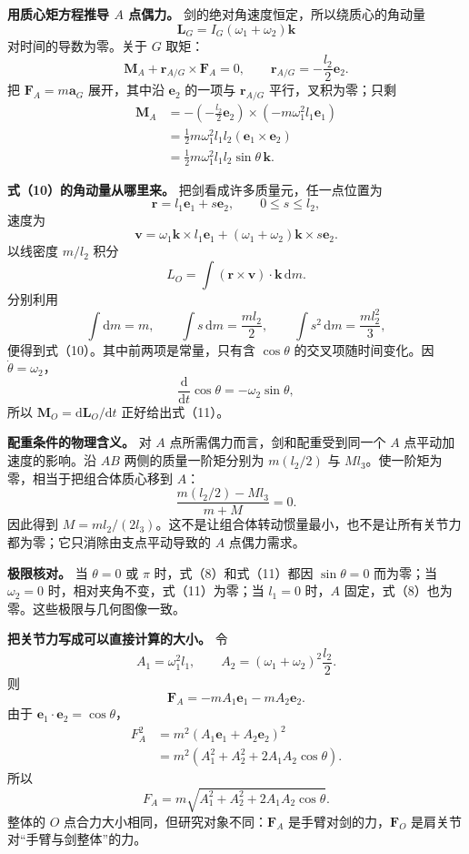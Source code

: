 \documentclass[12pt,a4paper,UTF8]{ctexart}
\begin{document}
\textbf{用质心矩方程推导 \(A\) 点偶力。}
剑的绝对角速度恒定，所以绕质心的角动量 \[
\boldsymbol L_G=I_G(\omega_1+\omega_2)\boldsymbol k
\] 对时间的导数为零。关于 \(G\) 取矩： \[
\boldsymbol M_A+\boldsymbol r_{A/G}\times\boldsymbol F_A=0,
\qquad
\boldsymbol r_{A/G}=-\frac{l_2}{2}\boldsymbol e_2.
\] 把 \(\boldsymbol F_A=m\boldsymbol a_G\) 展开，其中沿
\(\boldsymbol e_2\) 的一项与 \(\boldsymbol r_{A/G}\)
平行，叉积为零；只剩 \[
\begin{aligned}
\boldsymbol M_A
&=-\left(-\frac{l_2}{2}\boldsymbol e_2\right)
\times\left(-m\omega_1^2l_1\boldsymbol e_1\right)\\
&=\frac12m\omega_1^2l_1l_2
(\boldsymbol e_1\times\boldsymbol e_2)\\
&=\frac12m\omega_1^2l_1l_2\sin\theta\,\boldsymbol k.
\end{aligned}
\]

\textbf{式（10）的角动量从哪里来。} 把剑看成许多质量元，任一点位置为 \[
\boldsymbol r=l_1\boldsymbol e_1+s\boldsymbol e_2,
\qquad 0\le s\le l_2,
\] 速度为 \[
\boldsymbol v=\omega_1\boldsymbol k\times l_1\boldsymbol e_1
+(\omega_1+\omega_2)\boldsymbol k\times s\boldsymbol e_2.
\] 以线密度 \(m/l_2\) 积分 \[
L_O=\int(\boldsymbol r\times\boldsymbol v)\cdot\boldsymbol k\,\mathrm dm.
\] 分别利用 \[
\int\mathrm dm=m,
\qquad
\int s\,\mathrm dm=\frac{ml_2}{2},
\qquad
\int s^2\,\mathrm dm=\frac{ml_2^2}{3},
\] 便得到式（10）。其中前两项是常量，只有含 \(\cos\theta\)
的交叉项随时间变化。因 \(\dot\theta=\omega_2\)， \[
\frac{\mathrm d}{\mathrm dt}\cos\theta
=-\omega_2\sin\theta,
\] 所以 \(\boldsymbol M_O=\mathrm d\boldsymbol L_O/\mathrm dt\)
正好给出式（11）。

\textbf{配重条件的物理含义。} 对 \(A\)
点所需偶力而言，剑和配重受到同一个 \(A\) 点平动加速度的影响。沿 \(AB\)
两侧的质量一阶矩分别为 \(m(l_2/2)\) 与
\(Ml_3\)。使一阶矩为零，相当于把组合体质心移到 \(A\)： \[
\frac{m(l_2/2)-Ml_3}{m+M}=0.
\] 因此得到
\(M=ml_2/(2l_3)\)。这不是让组合体转动惯量最小，也不是让所有关节力都为零；它只消除由支点平动导致的
\(A\) 点偶力需求。

\textbf{极限核对。} 当 \(\theta=0\) 或 \(\pi\) 时，式（8）和式（11）都因
\(\sin\theta=0\) 而为零；当 \(\omega_2=0\)
时，相对夹角不变，式（11）为零；当 \(l_1=0\) 时，\(A\)
固定，式（8）也为零。这些极限与几何图像一致。

\textbf{把关节力写成可以直接计算的大小。} 令 \[
A_1=\omega_1^2l_1,
\qquad
A_2=(\omega_1+\omega_2)^2\frac{l_2}{2}.
\] 则 \[
\boldsymbol F_A
=-mA_1\boldsymbol e_1-mA_2\boldsymbol e_2.
\] 由于 \(\boldsymbol e_1\cdot\boldsymbol e_2=\cos\theta\)， \[
\begin{aligned}
F_A^2
&=m^2
(A_1\boldsymbol e_1+A_2\boldsymbol e_2)^2\\
&=m^2\left(
A_1^2+A_2^2+2A_1A_2\cos\theta
\right).
\end{aligned}
\] 所以 \[
F_A=m\sqrt{
A_1^2+A_2^2+2A_1A_2\cos\theta
}.
\] 整体的 \(O\) 点合力大小相同，但研究对象不同：\(\boldsymbol F_A\)
是手臂对剑的力，\(\boldsymbol F_O\) 是肩关节对``手臂与剑整体''的力。
\end{document}
